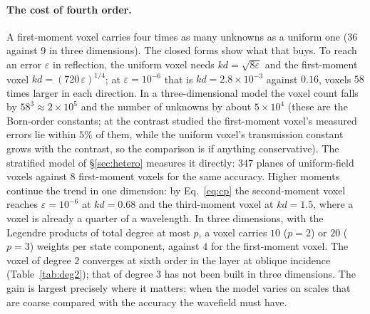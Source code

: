 \documentclass[11pt,a4paper]{article}
\begin{document}
\paragraph{The cost of fourth order.} A first-moment voxel carries four times as many unknowns as
a uniform one (36 against 9 in three dimensions). The closed forms show what that buys. To reach an
error $\varepsilon$ in reflection, the uniform voxel needs $kd=\sqrt{8\varepsilon}$ and the
first-moment voxel $kd=(720\,\varepsilon)^{1/4}$; at $\varepsilon=10^{-6}$ that is $kd=2.8\times
10^{-3}$ against $0.16$, voxels $58$ times larger in each direction. In a three-dimensional model the
voxel count falls by $58^3\approx2\times10^5$ and the number of unknowns by about $5\times10^4$
(these are the Born-order constants; at the contrast studied the first-moment voxel's measured errors
lie within $5\%$ of them, while the uniform voxel's transmission constant grows with the contrast, so
the comparison is if anything conservative).
The stratified model of \S\ref{sec:hetero} measures it directly: $347$ planes of uniform-field voxels
against $8$ first-moment voxels for the same accuracy. Higher moments continue the trend in one
dimension: by Eq.~\eqref{eq:cp} the second-moment voxel reaches $\varepsilon=10^{-6}$ at $kd=0.68$ and
the third-moment voxel at $kd=1.5$, where a voxel is already a quarter of a wavelength. In three dimensions, with the Legendre products of total degree at most $p$, a voxel carries $10$
($p=2$) or $20$ ($p=3$) weights per state component, against $4$ for the first-moment voxel. The voxel
of degree $2$ converges at sixth order in the layer at oblique incidence (Table~\ref{tab:deg2}); that of
degree $3$ has not been built in three dimensions. The gain is largest precisely where it matters: when the model varies on scales that are coarse
compared with the accuracy the wavefield must have.
\end{document}
